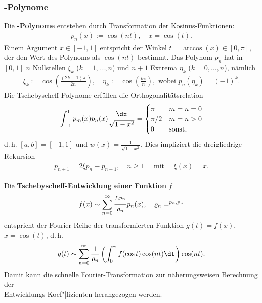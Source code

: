 \pagebreak

\subsubsection{%
    -Polynome%
}

Die \textbf{-Polynome} entstehen durch Transformation
der Kosinus-Funktionen:
\begin{align*}
    p_n(x) := \cos(nt), \quad
    x = \cos(t).
\end{align*}
Einem Argument $x \in [-1, 1]$ entspricht der Winkel
$t = \arccos(x) \in [0,\pi]$, der den Wert des Polynoms als $\cos(nt)$
bestimmt.
Das Polynom $p_n$ hat in $[0,1]$ $n$ Nullstellen $\xi_k$ ($k = 1, \dotsc, n$)
und $n + 1$ Extrema $\eta_k$ ($k = 0, \dotsc, n$), nämlich
\begin{align*}
    \xi_k := \cos\left(\frac{(2k - 1)\pi}{2n}\right), \quad
    \eta_k := \cos\left(\frac{k\pi}{n}\right), \text{ wobei }
    p_n(\eta_k) = (-1)^k.
\end{align*}
Die Tschebyscheff-Polynome erfüllen die Orthogonalitätsrelation
\begin{align*}
    \int_{-1}^1 p_m(x) p_n(x) \frac{\dx}{\sqrt{1 - x^2}} =
    \begin{cases}\pi & m = n = 0 \\ \pi/2 & m = n > 0 \\ 0 & \text{sonst},
    \end{cases}
\end{align*}
d.\,h. $[a,b] = [-1, 1]$ und $w(x) = \frac{1}{\sqrt{1 - x^2}}$.
Dies impliziert die dreigliedrige Rekursion
\begin{align*}
    p_{n+1} = 2 \xi p_n - p_{n-1}, \quad n \ge 1 \quad \text{ mit } \quad
    \xi(x) = x.
\end{align*}

\linie

Die \textbf{Tschebyscheff-Entwicklung einer Funktion} $f$
\begin{align*}
    f(x) \sim \sum_{n=0}^\infty \frac{\sp{f, p_n}}{\varrho_n} p_n(x),
    \quad \varrho_n = \sp{p_n, p_n}
\end{align*}
entspricht der Fourier-Reihe der transformierten Funktion $g(t) = f(x)$,
$x = \cos(t)$, d.\,h.
\begin{align*}
    g(t) \sim \sum_{n=0}^\infty \frac{1}{\varrho_n}
    \left(\int_0^\pi f(\cos t) \cos(nt) \dt\right) \cos(nt).
\end{align*}
Damit kann die schnelle Fourier-Transformation zur näherungsweisen Berechnung
der \\
Entwicklungs-Koef"|fizienten herangezogen werden.


